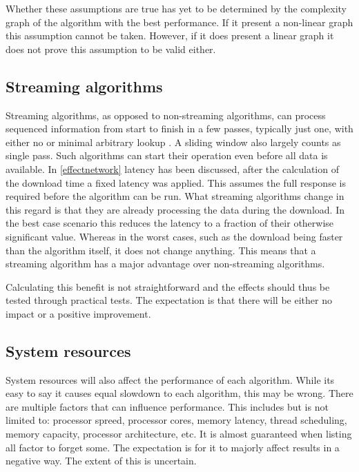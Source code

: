 \documentclass[11pt,a4paper]{report}
\begin{document}
Whether these assumptions are true has yet to be determined by the complexity graph of the algorithm with the best performance. If it present a non-linear graph this assumption cannot be taken. However, if it does present a linear graph it does not prove this assumption to be valid either.

\subsection{Streaming algorithms}

Streaming algorithms, as opposed to non-streaming algorithms, can process sequenced information from start to finish in a few passes, typically just one, with either no or minimal arbitrary lookup \cite{streamalg}. A sliding window also largely counts as single pass. Such algorithms can start their operation even before all data is available. In \ref{effectnetwork} latency has been discussed, after the calculation of the download time a fixed latency was applied. This assumes the full response is required before the algorithm can be run. What streaming algorithms change in this regard is that they are already processing the data during the download. In the best case scenario this reduces the latency to a fraction of their otherwise significant value. Whereas in the worst cases, such as the download being faster than the algorithm itself, it does not change anything. This means that a streaming algorithm has a major advantage over non-streaming algorithms.

Calculating this benefit is not straightforward and the effects should thus be tested through practical tests. The expectation is that there will be either no impact or a positive improvement.

\subsection{System resources}

System resources will also affect the performance of each algorithm. While its easy to say it causes equal slowdown to each algorithm, this may be wrong. There are multiple factors that can influence performance. This includes but is not limited to: processor spreed, processor cores, memory latency, thread scheduling, memory capacity, processor architecture, etc. It is almost guaranteed when listing all factor to forget some. The expectation is for it to majorly affect results in a negative way. The extent of this is uncertain.
\end{document}
